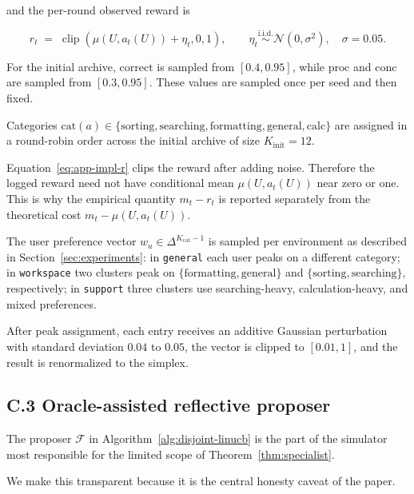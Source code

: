 \documentclass{article} %
\begin{document}
and the per-round observed reward is

\begin{equation}
\label{eq:app-impl-r}
r_t
\;=\;
\operatorname{clip}\!\left(\mu(U,a_t(U))+\eta_t,0,1\right),
\qquad
\eta_t\overset{\mathrm{i.i.d.}}{\sim}\mathcal N(0,\sigma^2),
\quad \sigma=0.05.
\end{equation}

For the initial archive, \(\mathrm{correct}\) is sampled from
\([0.4,0.95]\), while \(\mathrm{proc}\) and \(\mathrm{conc}\) are sampled from
\([0.3,0.95]\). These values are sampled once per seed and then fixed.

Categories $\mathrm{cat}(a) \in \{\text{sorting}, \text{searching}, \text{formatting}, \text{general}, \text{calc}\}$ are assigned in a round-robin order across the initial archive of size $K_{\text{init}} = 12$.

Equation~\eqref{eq:app-impl-r} clips the reward after adding noise. Therefore
the logged reward need not have conditional mean \(\mu(U,a_t(U))\) near zero or
one. This is why the empirical quantity \(m_t-r_t\) is reported separately
from the theoretical cost \(m_t-\mu(U,a_t(U))\).

The user preference vector \(w_u\in\Delta^{K_{\mathrm{cat}}-1}\) is sampled per
environment as described in Section~\ref{sec:experiments}: in
\texttt{general} each user peaks on a different category; in
\texttt{workspace} two clusters peak on
\(\{\text{formatting},\text{general}\}\) and
\(\{\text{sorting},\text{searching}\}\), respectively; in \texttt{support}
three clusters use searching-heavy, calculation-heavy, and mixed preferences.

After peak assignment, each entry receives an additive Gaussian perturbation with standard deviation $0.04$ to $0.05$, the vector is clipped to $[0.01, 1]$, and the result is renormalized to the simplex.

\subsection{C.3 Oracle-assisted reflective proposer}

\label{app:impl-reflection}

The proposer \(\mathcal F\) in Algorithm~\ref{alg:disjoint-linucb} is the part
of the simulator most responsible for the limited scope of
Theorem~\ref{thm:specialist}.

We make this transparent because it is the central honesty caveat of the paper.
\end{document}
